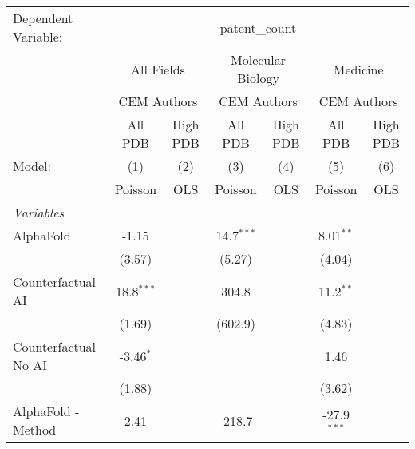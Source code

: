 \begingroup
\centering
\begin{tabular}{lcccccc}
   \tabularnewline \midrule \midrule
   Dependent Variable: & \multicolumn{6}{c}{patent\_count}\\
 & \multicolumn{2}{c}{All Fields} & \multicolumn{2}{c}{Molecular Biology} & \multicolumn{2}{c}{Medicine} \\
\cmidrule(lr){2-3} \cmidrule(lr){4-5} \cmidrule(lr){6-7}
 & \multicolumn{2}{c}{CEM Authors} & \multicolumn{2}{c}{CEM Authors} & \multicolumn{2}{c}{CEM Authors} \\
\cmidrule(lr){2-3} \cmidrule(lr){4-5} \cmidrule(lr){6-7}
 & \multicolumn{1}{c}{All PDB} & \multicolumn{1}{c}{High PDB} & \multicolumn{1}{c}{All PDB} & \multicolumn{1}{c}{High PDB} & \multicolumn{1}{c}{All PDB} & \multicolumn{1}{c}{High PDB} \\
\cmidrule(lr){2-2} \cmidrule(lr){3-3} \cmidrule(lr){4-4} \cmidrule(lr){5-5} \cmidrule(lr){6-6} \cmidrule(lr){7-7}
   Model:                                                     & (1)           & (2)  & (3)          & (4)  & (5)           & (6)\\  
                                                              &  Poisson      & OLS  & Poisson      & OLS  & Poisson       & OLS\\  
   \midrule
   \emph{Variables}\\
   AlphaFold                                                  & -1.15         &      & 14.7$^{***}$ &      & 8.01$^{**}$   &   \\   
                                                              & (3.57)        &      & (5.27)       &      & (4.04)        &   \\   
   Counterfactual AI                                          & 18.8$^{***}$  &      & 304.8        &      & 11.2$^{**}$   &   \\   
                                                              & (1.69)        &      & (602.9)      &      & (4.83)        &   \\   
   Counterfactual No AI                                       & -3.46$^{*}$   &      &              &      & 1.46          &   \\   
                                                              & (1.88)        &      &              &      & (3.62)        &   \\   
   AlphaFold - Method                                         & 2.41          &      & -218.7       &      & -27.9$^{***}$ &   \\   

\end{tabular}
